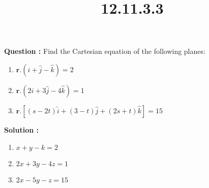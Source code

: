 \documentclass[12pt]{article}
\providecommand{\brak}[1]{\ensuremath{\left(#1\right)}}
\let\vec\mathbf
\begin{document}
\title{\textbf{12.11.3.3}}
\date{}
\maketitle
\textbf{Question :} Find the Cartesian equation of the following planes:


\begin{enumerate}
    \item $\vec{r}.\brak{\hat{i}+\hat{j}-\hat{k}}=2$
    \item $\vec{r}.\brak{2\hat{i}+3\hat{j}-4\hat{k}}=1$
    \item $\vec{r}.[\brak{s-2t}\hat{i}+\brak{3-t}\hat{j}+\brak{2s+t}\hat{k}]=15$
\end{enumerate}


\textbf{Solution :}
\begin{enumerate}
    \item $x+y-k=2$
    \item $2x+3y-4z=1$
    \item $2x-5y-z=15$
\end{enumerate}
\end{document}
